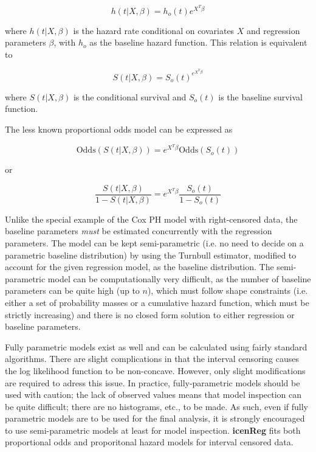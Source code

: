 \documentclass[11pt]{report}
\begin{document}
  \[ h(t | X, \beta) = h_o(t) e^{X^T \beta} \]
  
  where $h(t | X, \beta)$ is the hazard rate conditional on covariates $X$ and regression parameters $\beta$,
  with $h_o$ as the baseline hazard function. This relation is equivalent to 

  \[S(t | X, \beta) = S_o(t)^{e^{X^T \beta} } \]
  
  where $S(t| X, \beta)$ is the conditional survival and $S_o(t)$ is the baseline survival function. 
  
  The less known proportional odds model can be expressed as
  
  \[\text{Odds}(S(t | X, \beta)) = e^{X^T \beta} \text{Odds}(S_o(t)) \]
  \begin{center}  
  or
  \end{center}
  \[ \frac{S(t | X, \beta)} {1 - S(t | X, \beta) } = e^{X^T \beta}\frac{S_o(t)} {1 - S_o(t)} \]
  
  
  Unlike the special example
  of the Cox PH model with right-censored data, the baseline parameters 
  \emph{must} be estimated concurrently
  with the regression parameters. The model can be kept semi-parametric (i.e. no need to 
  decide on a parametric baseline distribution) by using the Turnbull estimator, modified
  to account for the given regression model, as the baseline distribution. 
  The semi-parametric model can be computationally very difficult,
  as the number of baseline parameters can be quite high (up to $n$), which must follow
  shape constraints (i.e. either a set of probability masses or a cumulative hazard function,
  which must be strictly increasing) and there is no closed form solution to either
  regression or baseline parameters.
  
  Fully parametric models exist as well and can be calculated using fairly standard
  algorithms. There are slight complications in that the interval censoring causes the log
  likelihood function to be non-concave. However, only slight modifications are required to 
  adress this issue. In practice, fully-parametric models should be used with caution; the
  lack of observed values means that model inspection can be quite difficult; there are no
  histograms, etc., to be made. As such, even if fully parametric models are to be used for
  the final analysis, it is strongly encouraged to use semi-parametric models at least for
  model inspection. {\bf icenReg} fits both proportional odds and proporitonal hazard models for interval
  censored data. 
  
\end{document}
